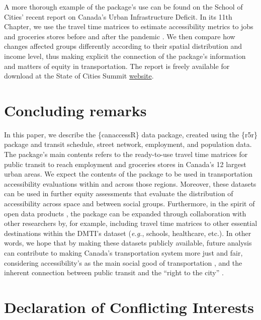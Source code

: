 \documentclass[Royal,times,sageh]{sagej}
\begin{document}
A more thorough example of the package's use can be found on the School
of Cities' recent report on Canada's Urban Infrastructure Deficit. In
its 11th Chapter, we use the travel time matrices to estimate
accessibility metrics to jobs and groceries stores before and after the
pandemic \citep{pargaDemocraticAccessOur2024}. We then compare how
changes affected groups differently according to their spatial
distribution and income level, thus making explicit the connection of
the package's information and matters of equity in transportation. The
report is freely available for download at the State of Cities Summit
\href{https://stateofcitiessummit.ca/report}{website}.

\section{Concluding remarks}\label{concluding-remarks}

In this paper, we describe the \{canaccessR\} data package, created
using the \{r5r\} package and transit schedule, street network,
employment, and population data. The package's main contents refers to
the ready-to-use travel time matrices for public transit to reach
employment and groceries stores in Canada's 12 largest urban areas. We
expect the contents of the package to be used in transportation
accessibility evaluations within and across those regions. Moreover,
these datasets can be used in further equity assessments that evaluate
the distribution of accessibility across space and between social
groups. Furthermore, in the spirit of open data products
\citep{arribas-belOpenDataProductsA2021}, the package can be expanded
through collaboration with other researchers by, for example, including
travel time matrices to other essential destinations within the DMTI's
dataset (\emph{e.g.}, schools, healthcare, etc.). In other words, we
hope that by making these datasets publicly available, future analysis
can contribute to making Canada's transportation system more just and
fair, considering accessibility's as the main social good of
transportation \citep{martensTransportJusticeDesigning2016}, and the
inherent connection between public transit and the ``right to the city''
\citep{cogginRightTransportMoving2015}.

\section{Declaration of Conflicting
Interests}\label{declaration-of-conflicting-interests}
\end{document}
